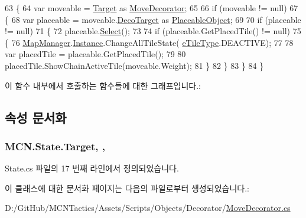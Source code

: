 \begin{DoxyCode}
63         \{
64             var moveable = \hyperlink{class_m_c_n_1_1_state_a79a563b32f183c9adc9a96679fc57eb8}{Target} as \hyperlink{class_move_decorator}{MoveDecorator};
65 
66             \textcolor{keywordflow}{if} (moveable != null)
67             \{
68                 var placeable = moveable.\hyperlink{class_m_c_n_1_1_decorator_a1306a0a8b814650cd5970a1ffc7ba2fe}{DecoTarget} as \hyperlink{class_placeable_object}{PlaceableObject};
69 
70                 \textcolor{keywordflow}{if} (placeable != null)
71                 \{
72                     placeable.\hyperlink{class_placeable_object_a019818f3f6c6eb715fed163efa921f5a}{Select}();
73 
74                     \textcolor{keywordflow}{if} (placeable.GetPlacedTile() != null)
75                     \{
76                         \hyperlink{class_map_manager}{MapManager}.\hyperlink{class_m_c_n_1_1_mono_singletone_aa50c027cca64cf4ad30c1ee5c83e0b78}{Instance}.ChangeAllTileState(
      \hyperlink{_tile_8cs_a271bc07be325bca511bcb747e0ff2fda}{eTileType}.DEACTIVE);
77 
78                         var placedTile = placeable.GetPlacedTile();
79 
80                         placedTile.ShowChainActiveTile(moveable.Weight);
81                     \}
82                 \}
83             \}
84         \}
\end{DoxyCode}


이 함수 내부에서 호출하는 함수들에 대한 그래프입니다.\+:




\subsection{속성 문서화}
\subsubsection[{\texorpdfstring{Target}{Target}}]{ M\+C\+N.\+State.\+Target\hspace{0.3cm}{\ttfamily [get]}, {\ttfamily [protected]}, {\ttfamily [inherited]}}\hypertarget{class_m_c_n_1_1_state_a79a563b32f183c9adc9a96679fc57eb8}{}\label{class_m_c_n_1_1_state_a79a563b32f183c9adc9a96679fc57eb8}


State.\+cs 파일의 17 번째 라인에서 정의되었습니다.



이 클래스에 대한 문서화 페이지는 다음의 파일로부터 생성되었습니다.\+:\begin{DoxyCompactItemize}
\item 
D\+:/\+Git\+Hub/\+M\+C\+N\+Tactics/\+Assets/\+Scripts/\+Objects/\+Decorator/\hyperlink{_move_decorator_8cs}{Move\+Decorator.\+cs}\end{DoxyCompactItemize}
